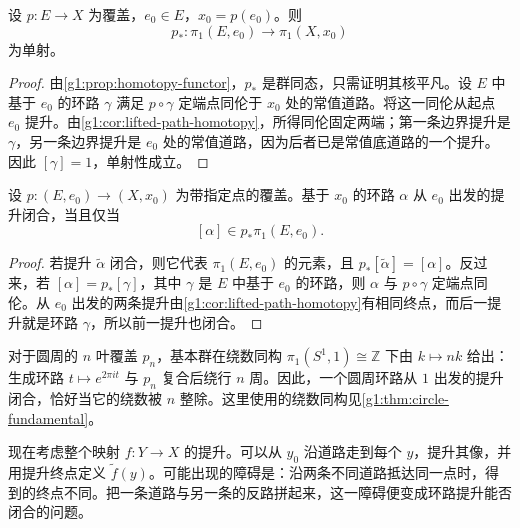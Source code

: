 \begin{proposition}\label{g1:prop:covering-pi1-injective}
	设 \(p:E\to X\) 为覆盖，\(e_0\in E\)，\(x_0=p(e_0)\)。则
	\[
		p_*:\pi_1(E,e_0)\longrightarrow\pi_1(X,x_0)
	\]
	为单射。
\end{proposition}
\begin{proof}
	由\cref{g1:prop:homotopy-functor}，\(p_*\) 是群同态，只需证明其核平凡。设 \(E\) 中基于 \(e_0\) 的环路 \(\gamma\) 满足 \(p\circ\gamma\) 定端点同伦于 \(x_0\) 处的常值道路。将这一同伦从起点 \(e_0\) 提升。由\cref{g1:cor:lifted-path-homotopy}，所得同伦固定两端；第一条边界提升是 \(\gamma\)，另一条边界提升是 \(e_0\) 处的常值道路，因为后者已是常值底道路的一个提升。因此 \([\gamma]=1\)，单射性成立。
\end{proof}

\begin{corollary}\label{g1:cor:closed-lift-criterion}
	设 \(p:(E,e_0)\to(X,x_0)\) 为带指定点的覆盖。基于 \(x_0\) 的环路 \(\alpha\) 从 \(e_0\) 出发的提升闭合，当且仅当
	\[
		[\alpha]\in p_*\pi_1(E,e_0).
	\]
\end{corollary}
\begin{proof}
	若提升 \(\widetilde\alpha\) 闭合，则它代表 \(\pi_1(E,e_0)\) 的元素，且 \(p_*[\widetilde\alpha]=[\alpha]\)。反过来，若 \([\alpha]=p_*[\gamma]\)，其中 \(\gamma\) 是 \(E\) 中基于 \(e_0\) 的环路，则 \(\alpha\) 与 \(p\circ\gamma\) 定端点同伦。从 \(e_0\) 出发的两条提升由\cref{g1:cor:lifted-path-homotopy}有相同终点，而后一提升就是环路 \(\gamma\)，所以前一提升也闭合。
\end{proof}

对于圆周的 \(n\) 叶覆盖 \(p_n\)，基本群在绕数同构 \(\pi_1(S^1,1)\cong\mathbb Z\) 下由 \(k\mapsto nk\) 给出：生成环路 \(t\mapsto e^{2\pi it}\) 与 \(p_n\) 复合后绕行 \(n\) 周。因此，一个圆周环路从 \(1\) 出发的提升闭合，恰好当它的绕数被 \(n\) 整除。这里使用的绕数同构见\cref{g1:thm:circle-fundamental}。

\ProseParagraphBreak

现在考虑整个映射 \(f:Y\to X\) 的提升。可以从 \(y_0\) 沿道路走到每个 \(y\)，提升其像，并用提升终点定义 \(\widetilde f(y)\)。可能出现的障碍是：沿两条不同道路抵达同一点时，得到的终点不同。把一条道路与另一条的反路拼起来，这一障碍便变成环路提升能否闭合的问题。

